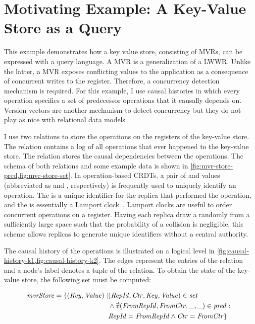 \section{Motivating Example: A Key-Value Store as a Query}\label{sec:motivating-example}

This example demonstrates how a key value store,
consisting of \acp{MVR}, can be expressed with a query language.
A \ac{MVR} is a generalization of a \ac{LWWR}.
Unlike the latter, a \ac{MVR} exposes conflicting values to the application
as a consequence of concurrent writes to the register.
Therefore, a concurrency detection mechanism is required.
For this example, I use causal histories in which every operation specifies
a set of predecessor operations that it causally depends on.
Version vectors are another mechanism to detect concurrency
but they do not play as nice with relational data models.

I use two relations to store the operations on the registers of the key-value store.
The  relation contains a log of all operations
that ever happened to the key-value store.
The  relation stores the causal dependencies between the operations.
The schema of both relations and some example data is shown in
\ref{fig:mvr-store-pred,fig:mvr-store-set}.
In operation-based \acp{CRDT}, a pair of  and  values
(abbreviated as  and , respectively) is frequently used
to uniquely identify an operation.
The  is a unique identifier for the replica that performed the
operation, and the  is essentially a Lamport clock~\cite{lamport2019time}.
Lamport clocks are useful to order concurrent operations on a register.
Having each replica draw a  randomly from a sufficiently large space
such that the probability of a collision is negligible,
this scheme allows replicas to generate unique identifiers without a central authority.



The causal history of the operations is illustrated on a logical level
in \ref{fig:causal-history-k1,fig:causal-history-k2}.
The edges represent the entries of the  relation and a node's
 label denotes a tuple of the  relation.
To obtain the state of the key-value store, the following set must be computed:

\begin{align*}
	\mathit{mvrStore} = \{ (\mathit{Key}, \mathit{Value}) \mid
	 & (\mathit{RepId}, \mathit{Ctr}, \mathit{Key}, \mathit{Value}) \in \mathit{set}                      \\
	 & \land \nexists (\mathit{FromRepId}, \mathit{FromCtr}, \mathit{\_}, \mathit{\_}) \in \mathit{pred}: \\
	 & \mathit{RepId} = \mathit{FromRepId} \land \mathit{Ctr} = \mathit{FromCtr} \}
\end{align*}

